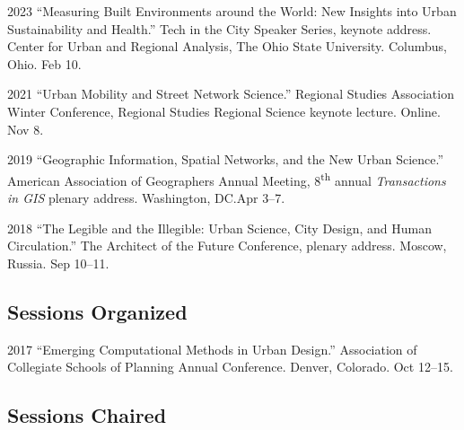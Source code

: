 \documentclass[11pt,letterpaper]{report}
\begin{document}
    \begin{tablist}

        \item[2023] \tab{}\enquote{Measuring Built Environments around the World: New Insights into Urban Sustainability and Health.} Tech in the City Speaker Series, keynote address. Center for Urban and Regional Analysis, The Ohio State University. Columbus, Ohio. Feb 10.

        \item[2021] \tab{}\enquote{Urban Mobility and Street Network Science.} Regional Studies Association Winter Conference, Regional Studies Regional Science keynote lecture. Online. Nov 8.

        \item[2019] \tab{}\enquote{Geographic Information, Spatial Networks, and the New Urban Science.} American Association of Geographers Annual Meeting, 8\textsuperscript{th} annual \textit{Transactions in GIS} plenary address. Washington, DC.\@ Apr 3--7.

        \item[2018] \tab{}\enquote{The Legible and the Illegible: Urban Science, City Design, and Human Circulation.} The Architect of the Future Conference, plenary address. Moscow, Russia. Sep 10--11.

    \end{tablist}

    \subsection*{Sessions Organized}

    \begin{tablist}

        \item[2017] \tab{}\enquote{Emerging Computational Methods in Urban Design.} Association of Collegiate Schools of Planning Annual Conference. Denver, Colorado. Oct 12--15.

    \end{tablist}

    \subsection*{Sessions Chaired}
\end{document}

